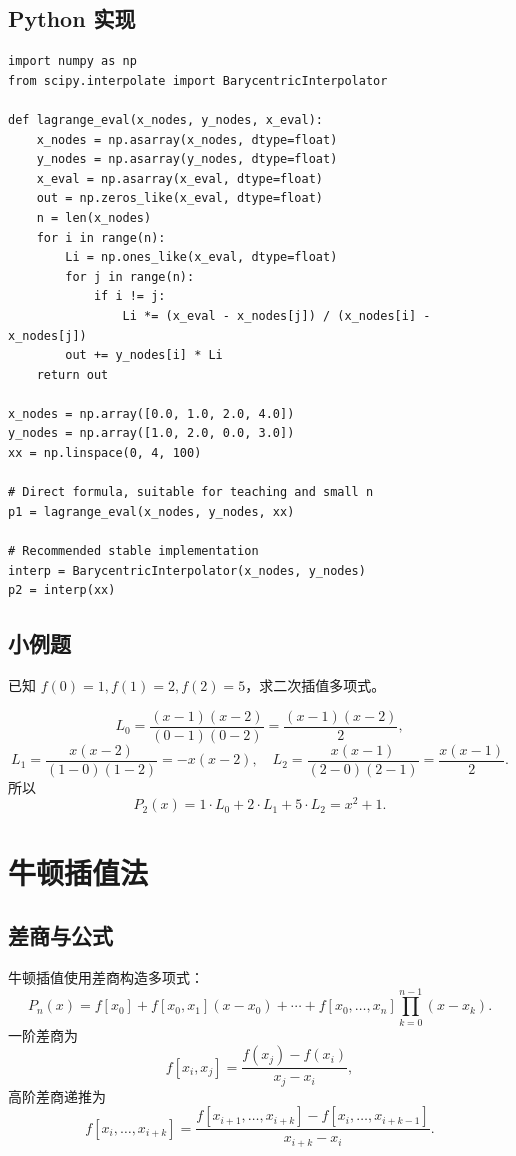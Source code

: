 \documentclass[11pt,a4paper]{ctexart}
\begin{document}
\subsection{Python 实现}

\begin{lstlisting}
import numpy as np
from scipy.interpolate import BarycentricInterpolator

def lagrange_eval(x_nodes, y_nodes, x_eval):
    x_nodes = np.asarray(x_nodes, dtype=float)
    y_nodes = np.asarray(y_nodes, dtype=float)
    x_eval = np.asarray(x_eval, dtype=float)
    out = np.zeros_like(x_eval, dtype=float)
    n = len(x_nodes)
    for i in range(n):
        Li = np.ones_like(x_eval, dtype=float)
        for j in range(n):
            if i != j:
                Li *= (x_eval - x_nodes[j]) / (x_nodes[i] - x_nodes[j])
        out += y_nodes[i] * Li
    return out

x_nodes = np.array([0.0, 1.0, 2.0, 4.0])
y_nodes = np.array([1.0, 2.0, 0.0, 3.0])
xx = np.linspace(0, 4, 100)

# Direct formula, suitable for teaching and small n
p1 = lagrange_eval(x_nodes, y_nodes, xx)

# Recommended stable implementation
interp = BarycentricInterpolator(x_nodes, y_nodes)
p2 = interp(xx)
\end{lstlisting}

\subsection{小例题}

已知 $f(0)=1,f(1)=2,f(2)=5$，求二次插值多项式。

\[
L_0=\frac{(x-1)(x-2)}{(0-1)(0-2)}=\frac{(x-1)(x-2)}{2},
\]
\[
L_1=\frac{x(x-2)}{(1-0)(1-2)}=-x(x-2),
\quad
L_2=\frac{x(x-1)}{(2-0)(2-1)}=\frac{x(x-1)}{2}.
\]
所以
\[
P_2(x)=1\cdot L_0+2\cdot L_1+5\cdot L_2=x^2+1.
\]

\newpage
\section{牛顿插值法}

\subsection{差商与公式}

牛顿插值使用差商构造多项式：
\[
P_n(x)=f[x_0]+f[x_0,x_1](x-x_0)+\cdots+f[x_0,\ldots,x_n]\prod_{k=0}^{n-1}(x-x_k).
\]
一阶差商为
\[
  f[x_i,x_j]=\frac{f(x_j)-f(x_i)}{x_j-x_i},
\]
高阶差商递推为
\[
  f[x_i,\ldots,x_{i+k}]
  =\frac{f[x_{i+1},\ldots,x_{i+k}]-f[x_i,\ldots,x_{i+k-1}]}{x_{i+k}-x_i}.
\]
\end{document}
